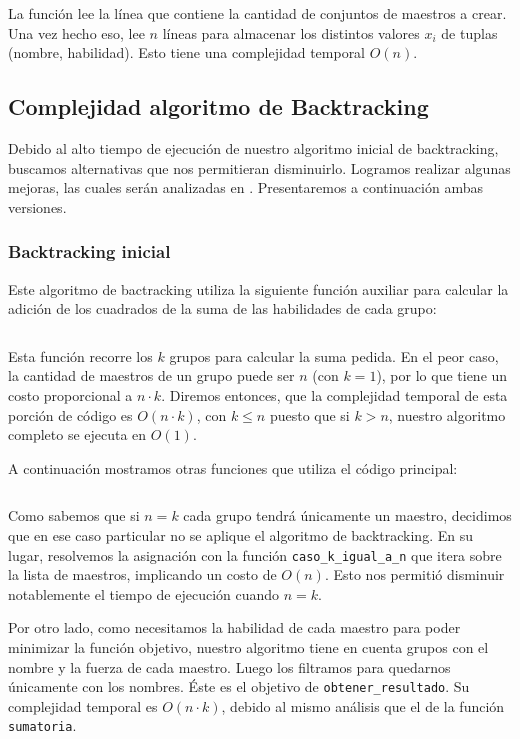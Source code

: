 \documentclass{article}
\begin{document}
La función lee la línea que contiene la cantidad de conjuntos de maestros a crear. Una vez hecho eso, lee $n$ líneas para almacenar los distintos valores $x_i$ de tuplas (nombre, habilidad). Esto tiene una complejidad temporal $O(n)$.

\subsection{Complejidad algoritmo de Backtracking}

Debido al alto tiempo de ejecución de nuestro algoritmo inicial de backtracking, buscamos alternativas que nos permitieran disminuirlo. Logramos realizar algunas mejoras, las cuales serán analizadas en . Presentaremos a continuación ambas versiones. 

\subsubsection{Backtracking inicial}
Este algoritmo de bactracking utiliza la siguiente función auxiliar para calcular la adición de los cuadrados de la suma de las habilidades de cada grupo:
\inputminted[linenos, firstline=47, lastline=54]{python}{codigo/backtracking.py}

Esta función recorre los $k$ grupos para calcular la suma pedida. En el peor caso, la cantidad de maestros de un grupo puede ser $n$ (con $k = 1$), por lo que tiene un costo proporcional a $n \cdot k$. Diremos entonces, que la complejidad temporal de esta porción de código es $O(n \cdot k)$, con $k \leq n$ puesto que si $k > n$, nuestro algoritmo completo se ejecuta en $O(1)$.  

A continuación mostramos otras funciones que utiliza el código principal:

\inputminted[linenos, firstline=56, lastline=73]{python}{codigo/backtracking.py}

Como sabemos que si $n = k$ cada grupo tendrá únicamente un maestro, decidimos que en ese caso particular no se aplique el algoritmo de backtracking. En su lugar, resolvemos la asignación con la función \texttt{caso\_k\_igual\_a\_n} que itera sobre la lista de maestros, implicando un costo de $O(n)$. Esto nos permitió disminuir notablemente el tiempo de ejecución cuando $n = k$. 

Por otro lado, como necesitamos la habilidad de cada maestro para poder minimizar la función objetivo, nuestro algoritmo tiene en cuenta grupos con el nombre y la fuerza de cada maestro. Luego los filtramos para quedarnos únicamente con los nombres. Éste es el objetivo de \texttt{obtener\_resultado}. Su complejidad temporal es $O(n \cdot k)$, debido al mismo análisis que el de la función \texttt{sumatoria}.
\end{document}
